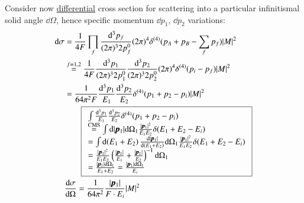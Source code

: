Consider now \underline{differential} cross section for scattering into a particular infinitismal solid angle $\dd \Omega$, hence specific momentum $\dd p_1$, $\dd p_2$ variations:
\begin{align}
	\dd \sigma &= \frac{1}{4F}\prod_f \frac{\dd^3 p_f}{(2\pi)^3 2p_f^0} (2\pi)^4 \delta^{(4)}(p_A+p_B-\sum_f p_f)|M|^2 \notag \\
			   &\stackrel{f=1,2}{=}  \frac{1}{4F} \frac{\dd^3 p_1}{(2\pi)^3 2p_1^0} \frac{\dd^3 p_2}{(2\pi)^3 2p_2^0} (2\pi)^4 \delta^{(4)}(p_i- p_f)|M|^2 \notag\\
			   &= \frac{1}{64\pi^2 F} \frac{\dd^3 p_1}{E_1} \frac{\dd^3 p_2}{E_2} \delta^{(4)}(p_1 + p_2 - p_i) |M|^2 \notag\\
			   &\qquad \boxed{ 
				   \begin{array}{ll}
				   \int \frac{\dd^3 p_1}{E_1} \frac{\dd^3 p_2}{E_2} \delta^{(4)}(p_1 + p_2 - p_i)  \\ 
				   \stackrel{\text{CMS}}{=} \int \dd |\pmb{p}_1| \dd \Omega_1 \frac{|\pmb{p}_1|^2}{E_1 E_2} \delta (E_1 + E_2 -E_i) \\
				   = \int \dd (E_1 + E_2) \frac{\dd |\pmb{p}_1|}{\dd (E_1 + E_2)} \dd \Omega_1 \frac{|\pmb{p}_1|^2}{E_1 E_2} \delta (E_1 + E_2 -E_i)   \\
				   = \frac{|\pmb{p}_1|^2}{E_1 E_2} \left( \frac{|\pmb{p}_1|}{E_1} + \frac{|\pmb{p}_1|}{E_2} \right)^{-1} \dd \Omega_1 \\
				   = \frac{|\pmb{p}_1|\dd \Omega_1}{E_1 + E_2} =  \frac{|\pmb{p}_1|\dd \Omega_1}{E_i}
				   \end{array}
			   } \notag \\
			   &\frac{\dd \sigma}{\dd \Omega} = \frac{1}{64 \pi^2} \frac{|\pmb{p}_1|}{F\cdot E_i} |M|^2	
\end{align}

